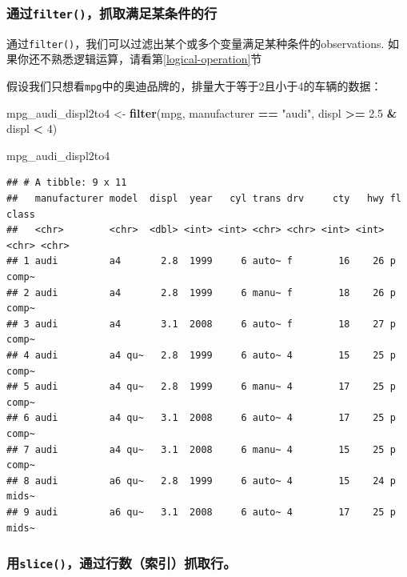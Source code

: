 \documentclass[]{book}
\newenvironment{Shaded}{\begin{snugshade}}{\end{snugshade}}
\newcommand{\DecValTok}[1]{\textcolor[rgb]{0.00,0.00,0.81}{#1}}
\newcommand{\FloatTok}[1]{\textcolor[rgb]{0.00,0.00,0.81}{#1}}
\newcommand{\KeywordTok}[1]{\textcolor[rgb]{0.13,0.29,0.53}{\textbf{#1}}}
\newcommand{\NormalTok}[1]{#1}
\newcommand{\OperatorTok}[1]{\textcolor[rgb]{0.81,0.36,0.00}{\textbf{#1}}}
\newcommand{\StringTok}[1]{\textcolor[rgb]{0.31,0.60,0.02}{#1}}
\begin{document}
\hypertarget{filter}{%
\subsubsection{\texorpdfstring{通过\texttt{filter()}，抓取满足某条件的行}{通过filter()，抓取满足某条件的行}}\label{filter}}

通过\texttt{filter()}，我们可以过滤出某个或多个变量满足某种条件的observations. 如果你还不熟悉逻辑运算，请看第\ref{logical-operation}节

假设我们只想看\texttt{mpg}中的奥迪品牌的，排量大于等于2且小于4的车辆的数据：

\begin{Shaded}
\begin{Highlighting}[]
\NormalTok{mpg_audi_displ2to4 <-}\StringTok{ }\KeywordTok{filter}\NormalTok{(mpg, manufacturer }\OperatorTok{==}\StringTok{ "audi"}\NormalTok{, displ }\OperatorTok{>=}\StringTok{ }\FloatTok{2.5} \OperatorTok{&}\StringTok{ }\NormalTok{displ }\OperatorTok{<}\StringTok{ }\DecValTok{4}\NormalTok{)}

\NormalTok{mpg_audi_displ2to4}
\end{Highlighting}
\end{Shaded}

\begin{verbatim}
## # A tibble: 9 x 11
##   manufacturer model  displ  year   cyl trans drv     cty   hwy fl    class
##   <chr>        <chr>  <dbl> <int> <int> <chr> <chr> <int> <int> <chr> <chr>
## 1 audi         a4       2.8  1999     6 auto~ f        16    26 p     comp~
## 2 audi         a4       2.8  1999     6 manu~ f        18    26 p     comp~
## 3 audi         a4       3.1  2008     6 auto~ f        18    27 p     comp~
## 4 audi         a4 qu~   2.8  1999     6 auto~ 4        15    25 p     comp~
## 5 audi         a4 qu~   2.8  1999     6 manu~ 4        17    25 p     comp~
## 6 audi         a4 qu~   3.1  2008     6 auto~ 4        17    25 p     comp~
## 7 audi         a4 qu~   3.1  2008     6 manu~ 4        15    25 p     comp~
## 8 audi         a6 qu~   2.8  1999     6 auto~ 4        15    24 p     mids~
## 9 audi         a6 qu~   3.1  2008     6 auto~ 4        17    25 p     mids~
\end{verbatim}

\hypertarget{slice}{%
\subsubsection{\texorpdfstring{用\texttt{slice()}，通过行数（索引）抓取行。}{用slice()，通过行数（索引）抓取行。}}\label{slice}}
\end{document}
